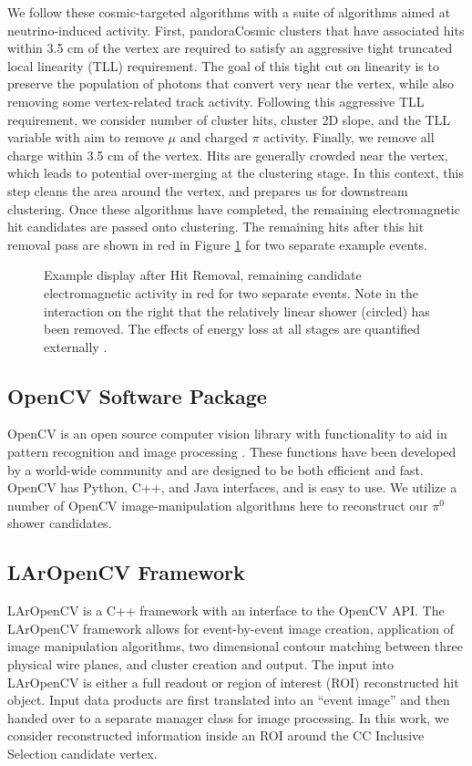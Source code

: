 \par We follow these cosmic-targeted algorithms with a suite of algorithms aimed at neutrino-induced activity. First, pandoraCosmic clusters that have associated hits within 3.5 cm of the vertex are required to satisfy an aggressive tight truncated local linearity (TLL) requirement. The goal of this tight cut on linearity is to preserve the population of photons that convert very near the vertex, while also removing some vertex-related track activity. Following this aggressive TLL requirement, we consider number of cluster hits, cluster 2D slope, and the TLL variable with aim to remove $\mu$ and charged $\pi$ activity. Finally, we remove all charge within 3.5 cm of the vertex. Hits are generally crowded near the vertex, which leads to potential over-merging at the clustering stage. In this context, this step cleans the area around the vertex, and prepares us for downstream clustering. Once these algorithms have completed, the remaining electromagnetic hit candidates are passed onto clustering. The remaining hits after this hit removal pass are shown in red in Figure \ref{fig:hitremoval} for two separate example events. 
\begin{figure}[h!]
\centering
{}
\caption{ Example display after Hit Removal, remaining candidate electromagnetic activity in red for two separate events. Note in the interaction on the right that the relatively linear shower (circled) has been removed. The effects of energy loss at all stages are quantified externally \cite{bib:davidc_missingE}.} 
\label{fig:hitremoval}
\end{figure}

\subsection{OpenCV Software Package}
OpenCV is an open source computer vision library with functionality to aid in pattern recognition and image processing \cite{bib:opencv}. These functions have been developed by a world-wide community and are designed to be both efficient and fast. OpenCV has Python, C++, and Java interfaces, and is easy to use. We utilize a number of OpenCV image-manipulation algorithms here to reconstruct our $\pi^0$ shower candidates.  %

\subsection{LArOpenCV Framework}
LArOpenCV is a C++ framework with an interface to the OpenCV API. The LArOpenCV framework allows for event-by-event image creation, application of image manipulation algorithms, two dimensional contour matching between three physical wire planes, and cluster creation and output. The input into LArOpenCV is either a full readout or region of interest (ROI) reconstructed hit object. Input data products are first translated into an ``event image'' and then handed over to a separate manager class for image processing. In this work, we consider reconstructed information inside an ROI around the CC Inclusive Selection candidate vertex.  

